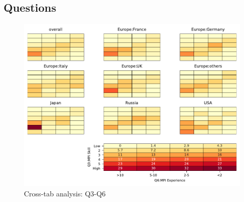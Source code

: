 
\subsection{Questions}


\begin{figure}
\begin{center}
\includegraphics[width=12cm]{../pdfs/Q3-Q6.pdf}
\caption{Cross-tab analysis: Q3-Q6}
\label{fig:Q3-Q6}
\end{center}
\end{figure}

